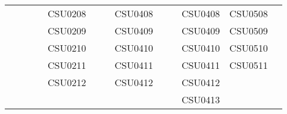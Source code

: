 \begin{table}[h!]
\begin{tabular}{|l|l|l|l|l|l|l|l|l|l|l|l|l|}
                           &          &                          & \multirow{6}{*}{} & CSU0208  & {\ul } & \multirow{6}{*}{} & CSU0408  &                    & \multirow{6}{*}{} & CSU0408  & CSU0508  &          \\ \cline{2-2} \cline{5-6} \cline{8-8} \cline{11-13} 
                           &          &                          &                   & CSU0209  & {\ul } &                   & CSU0409  &                    &                   & CSU0409  & CSU0509  &          \\ \cline{2-2} \cline{5-6} \cline{8-8} \cline{11-13} 
                           &          &                          &                   & CSU0210  & {\ul } &                   & CSU0410  &                    &                   & CSU0410  & CSU0510  &          \\ \cline{2-2} \cline{5-6} \cline{8-8} \cline{11-13} 
                           &          &                          &                   & CSU0211  & {\ul } &                   & CSU0411  &                    &                   & CSU0411  & CSU0511  &          \\ \cline{2-2} \cline{5-6} \cline{8-8} \cline{11-13} 
                           &          &                          &                   & CSU0212  & {\ul } &                   & CSU0412  &                    &                   & CSU0412  &          &          \\ \cline{2-2} \cline{5-6} \cline{8-8} \cline{11-13} 
                           &          &                          &                   &          & {\ul } &                   &          &                    &                   & CSU0413  &          &          \\ \hline
\end{tabular}
\end{table}






















